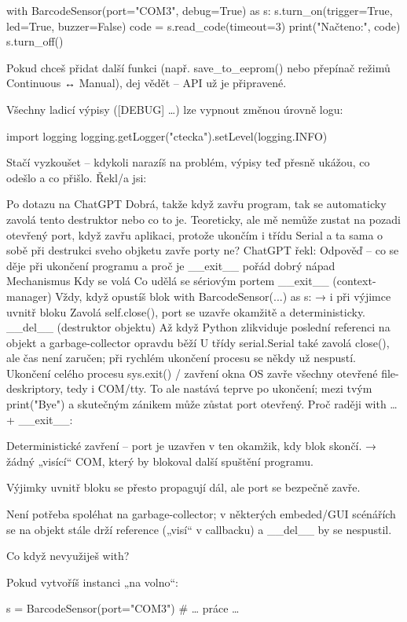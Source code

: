 with BarcodeSensor(port="COM3", debug=True) as s:
    s.turn_on(trigger=True, led=True, buzzer=False)
    code = s.read_code(timeout=3)
    print("Načteno:", code)
    s.turn_off()

Pokud chceš přidat další funkci (např. save_to_eeprom() nebo přepínač režimů Continuous ↔ Manual), dej vědět – API už je připravené.

Všechny ladicí výpisy ([DEBUG] …) lze vypnout změnou úrovně logu:

import logging
logging.getLogger("ctecka").setLevel(logging.INFO)

Stačí vyzkoušet – kdykoli narazíš na problém, výpisy teď přesně ukážou, co odešlo a co přišlo.
Řekl/a jsi:

Po dotazu na ChatGPT
Dobrá, takže když zavřu program, tak se automaticky zavolá tento destruktor nebo co to je. Teoreticky, ale mě nemůže zustat na pozadi otevřený port, když zavřu aplikaci, protože ukončím i třídu Serial a ta sama o sobě při destrukci sveho objketu zavře porty ne?
ChatGPT řekl:
Odpověď – co se děje při ukončení programu a proč je __exit__ pořád dobrý nápad
Mechanismus	Kdy se volá	Co udělá se sériovým portem
__exit__ (context-manager)	Vždy, když opustíš blok with BarcodeSensor(...) as s:   → i při výjimce uvnitř bloku	Zavolá self.close(), port se uzavře okamžitě a deterministicky.
__del__ (destruktor objektu)	Až když Python zlikviduje poslední referenci na objekt a garbage-collector opravdu běží	U třídy serial.Serial také zavolá close(), ale čas není zaručen; při rychlém ukončení procesu se někdy už nespustí.
Ukončení celého procesu	sys.exit() / zavření okna	OS zavře všechny otevřené file-deskriptory, tedy i COM/tty. To ale nastává teprve po ukončení; mezi tvým print("Bye") a skutečným zánikem může zůstat port otevřený.
Proč raději with … + __exit__:

    Deterministické zavření – port je uzavřen v ten okamžik, kdy blok skončí.
    → žádný „visící“ COM, který by blokoval další spuštění programu.

    Výjimky uvnitř bloku se přesto propagují dál, ale port se bezpečně zavře.

    Není potřeba spoléhat na garbage-collector; v některých embeded/GUI scénářích se na objekt stále drží reference („visí“ v callbacku) a __del__ by se nespustil.

Co když nevyužiješ with?

Pokud vytvoříš instanci „na volno“:

s = BarcodeSensor(port="COM3")
# … práce …

